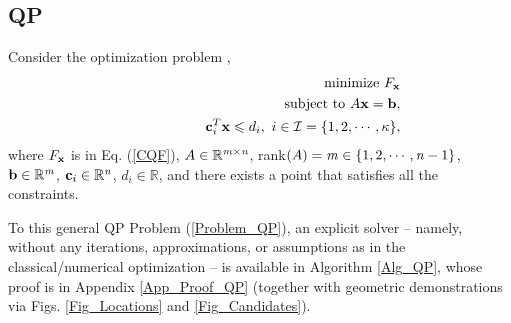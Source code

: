 \documentclass{imaman}
\newcommand{\beq}{\begin{eqnarray}}
\newcommand{\eeq}{\end{eqnarray}}
\newcommand{\bfb}{{\bf b}}
\newcommand{\bfc}{{\bf c}}
\newcommand{\bfx}{{\bf x}}
\newcommand{\real}{\mathbb{R}}
\newcommand{\calI}{{\mathcal I}}
\newcommand{\itm}{{\it m}}
\newcommand{\itn}{{\it n}}
\numberwithin{equation}{section}
\begin{document}
\subsection{QP}
\label{Subsec_QP}
Consider the optimization problem \citep{Lu(Ye):03(16)},
\beq
&&\mbox{minimize}~F_\bfx\nonumber\\
&&\mbox{subject to}~A\bfx=\bfb,\nonumber\\
&&\hspace{1.84cm}\bfc_i^T\bfx\le d_i,~i\in\calI=\{1,2,\cdots,\kappa\},
\label{Problem_QP}
\eeq
where $F_\bfx$ is in Eq. (\ref{CQF}), $A\in\real^{\itm\times\itn}$, rank$(A)=\itm\in\{1,2,\cdots,\itn-1\}$, $\bfb\in\real^\itm$, $\bfc_i\in\real^\itn$, $d_i\in\real$, and there exists a point that satisfies all the constraints.

To this general QP Problem (\ref{Problem_QP}), an explicit solver -- namely, without any iterations, approximations, or assumptions as in the classical/numerical optimization \citep{Lu(Ye):03(16),NoWr:06} -- is available in Algorithm \ref{Alg_QP}, whose proof is in Appendix \ref{App_Proof_QP} (together with geometric demonstrations via Figs. \ref{Fig_Locations} and \ref{Fig_Candidates}).
\end{document}
